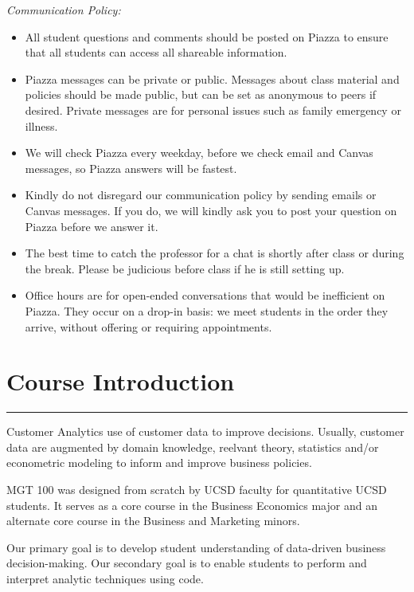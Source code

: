 \documentclass[12pt]{article}
\begin{document}
{\it Communication Policy:} 
\vspace{-0.15cm}
\begin{itemize}[noitemsep]
\item All student questions and comments should be posted on Piazza to ensure that all students can access all shareable information. 
\item Piazza messages can be private or public. Messages about class material and policies should be made public, but can be set as anonymous to peers if desired. Private messages are for personal issues such as family emergency or illness. 
\item We will check Piazza every weekday, before we check email and Canvas messages, so Piazza answers will be fastest. 
\item Kindly do not disregard our communication policy by sending emails or Canvas messages. If you do, we will kindly ask you to post your question on Piazza before we answer it. 
\item The best time to catch the professor for a chat is shortly after class or during the break. Please be judicious before class if he is still setting up. 
\item Office hours are for open-ended conversations that would be inefficient on Piazza. They occur on a drop-in basis: we meet students in the order they arrive, without offering or requiring appointments. 
\end{itemize}


\section*{Course Introduction}

\medskip
\hrule
\medskip


Customer Analytics use of customer data to improve decisions. Usually, customer data are augmented by domain knowledge, reelvant theory, statistics and/or econometric modeling to inform and improve business policies.

MGT 100 was designed from scratch by UCSD faculty for quantitative UCSD students. It serves as a core course in the Business Economics major and an alternate core course in the Business and Marketing minors.

Our primary goal is to develop student understanding of data-driven business decision-making. Our secondary goal is to enable students to perform and interpret analytic techniques using code.
\end{document}
